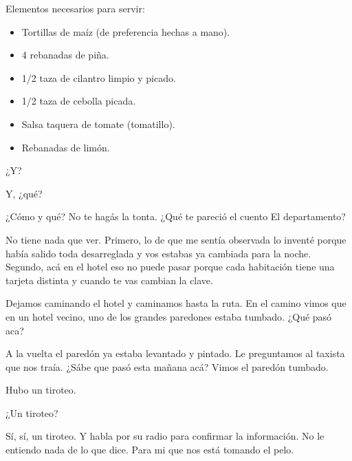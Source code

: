 \documentclass[12pt,twoside,openright,a5paper]{book}
\begin{document}
Elementos necesarios para servir:

\begin{itemize} \item Tortillas de maíz (de preferencia hechas a mano).
\item 4 rebanadas de piña.  \item 1/2 taza de cilantro limpio y picado.
\item 1/2 taza de cebolla picada.  \item Salsa taquera de tomate (tomatillo).
\item Rebanadas de limón.  \end{itemize}


\vspace{0.5cm}
\hrulefill\hspace{0.2cm} \decofourleft\decofourright \hspace{0.2cm} \hrulefill
\vspace{0.5cm}

¿Y?

Y, ¿qué?

¿Cómo y qué? No te hagás la tonta. ¿Qué te pareció el cuento El
departamento?

No tiene nada que ver. Primero, lo de que me sentía observada lo inventé
porque había salido toda desarreglada y vos estabas ya cambiada para la
noche. Segundo, acá en el hotel eso no puede pasar porque cada habitación
tiene una tarjeta distinta y cuando te vas cambian la clave.


\vspace{0.5cm}
\hrulefill\hspace{0.2cm} \decofourleft\decofourright \hspace{0.2cm} \hrulefill
\vspace{0.5cm}

Dejamos caminando el hotel y caminamos hasta la ruta. En el camino vimos que
en un hotel vecino, uno de los grandes paredones estaba tumbado. ¿Qué pasó
aca?

A la vuelta el paredón ya estaba levantado y pintado. Le preguntamos
al taxista que nos traía. ¿Sábe que pasó esta mañana acá? Vimos el
paredón tumbado.

Hubo un tiroteo.

¿Un tiroteo?

Sí, sí, un tiroteo. Y
habla por su radio para confirmar la información. No le entiendo nada de
lo que dice. Para mi que nos está tomando el pelo.


\vspace{0.5cm}
\hrulefill\hspace{0.2cm} \decofourleft\decofourright \hspace{0.2cm} \hrulefill
\vspace{0.5cm}
\end{document}
